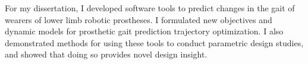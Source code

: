 
For my dissertation, I developed software tools to predict changes in the gait of wearers of lower limb robotic prostheses.
I formulated new objectives and dynamic models for prosthetic gait prediction trajectory optimization.
I also demonstrated methods for using these tools to conduct parametric design studies, and showed that doing so provides novel design insight.
\newline
\newline